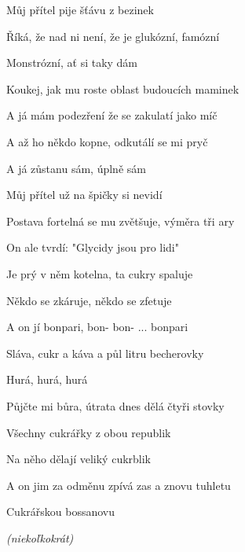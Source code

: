 \begin{song}
Můj přítel  pije šťávu z bezinek  \par
Říká, že nad ni není, že je glukózní, famózní \par
{}Monstrózní, ať si taky dám \par
Koukej, jak mu roste  oblast budoucích maminek  \par
A já mám podezření že se zakulatí jako míč \par
A až ho někdo kopne, odkutálí se mi pryč \par
A já zůstanu sám,  úplně sám  \par

\bigskip
\Refren
\bigskip

Můj přítel  už na špičky si nevidí  \par
Postava fortelná se mu zvětšuje, výměra tři ary  \par
On ale tvrdí:  "Glycidy jsou pro lidi"\  \par
Je prý v něm kotelna, ta cukry spaluje \par
Někdo se zkáruje, někdo se zfetuje \par
A on jí bonpari, bon- bon- ...   bonpari  \par

\bigskip

Sláva,  cukr a káva a půl litru becherovky \par
{}Hurá, hurá, hurá \par
Půjčte mi bůra, útrata dnes dělá čtyři stovky \par
Všechny cukrářky z obou republik \par
Na něho dělají veliký cukrblik \par
A on jim za odměnu zpívá zas a znovu tuhletu  \par
Cukrářskou bossanovu    \par

\bigskip

\Outro \par
{}    \textit{(niekoľkokrát)} \par
{} \par

\end{song}
